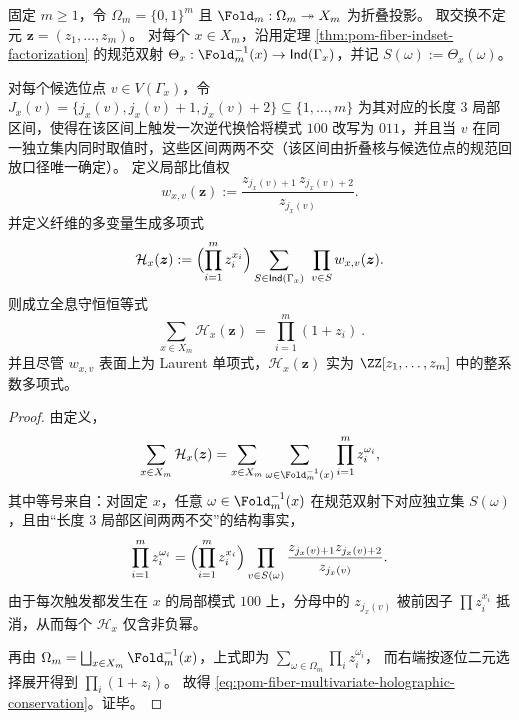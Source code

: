 \begin{theorem}\label{thm:pom-fiber-multivariate-holographic-conservation}
固定 \(m\ge 1\)，令 \(\Omega_m=\{0,1\}^m\) 且 \(\Fold_m:\Omega_m\twoheadrightarrow X_m\) 为折叠投影。
取交换不定元 \(\boldsymbol{z}=(z_1,\dots,z_m)\)。
对每个 \(x\in X_m\)，沿用定理 \ref{thm:pom-fiber-indset-factorization} 的规范双射
\(
\Theta_x:\Fold_m^{-1}(x)\to \mathsf{Ind}(\Gamma_x)
\)，并记 \(S(\omega):=\Theta_x(\omega)\)。
\par
对每个候选位点 \(v\in V(\Gamma_x)\)，令 \(J_x(v)=\{j_x(v),j_x(v)+1,j_x(v)+2\}\subseteq\{1,\dots,m\}\) 为其对应的长度 \(3\) 局部区间，使得在该区间上触发一次逆代换恰将模式 \(100\) 改写为 \(011\)，并且当 \(v\) 在同一独立集内同时取值时，这些区间两两不交（该区间由折叠核与候选位点的规范回放口径唯一确定）。
定义局部比值权
\[
w_{x,v}(\boldsymbol{z})
:=\frac{z_{j_x(v)+1}\,z_{j_x(v)+2}}{z_{j_x(v)}}.
\]
并定义纤维的多变量生成多项式
\[
\mathcal H_x(\boldsymbol{z})
:=\Bigl(\prod_{i=1}^{m}z_i^{x_i}\Bigr)
\sum_{S\in\mathsf{Ind}(\Gamma_x)}\ \prod_{v\in S}w_{x,v}(\boldsymbol{z}).
\]
则成立全息守恒恒等式
\begin{equation}\label{eq:pom-fiber-multivariate-holographic-conservation}
\boxed{\ \sum_{x\in X_m}\mathcal H_x(\boldsymbol{z})\ =\ \prod_{i=1}^{m}(1+z_i)\ }.
\end{equation}
并且尽管 \(w_{x,v}\) 表面上为 Laurent 单项式，\(\mathcal H_x(\boldsymbol{z})\) 实为 \(\ZZ[z_1,\dots,z_m]\) 中的整系数多项式。
\end{theorem}

\begin{proof}
由定义，
\[
\sum_{x\in X_m}\mathcal H_x(\boldsymbol{z})
=\sum_{x\in X_m}\sum_{\omega\in\Fold_m^{-1}(x)}\prod_{i=1}^{m}z_i^{\omega_i},
\]
其中等号来自：对固定 \(x\)，任意 \(\omega\in\Fold_m^{-1}(x)\) 在规范双射下对应独立集 \(S(\omega)\)，且由“长度 \(3\) 局部区间两两不交”的结构事实，
\[
\prod_{i=1}^{m}z_i^{\omega_i}
=\Bigl(\prod_{i=1}^{m}z_i^{x_i}\Bigr)\prod_{v\in S(\omega)}\frac{z_{j_x(v)+1}z_{j_x(v)+2}}{z_{j_x(v)}}.
\]
由于每次触发都发生在 \(x\) 的局部模式 \(100\) 上，分母中的 \(z_{j_x(v)}\) 被前因子 \(\prod z_i^{x_i}\) 抵消，从而每个 \(\mathcal H_x\) 仅含非负幂。
\par
再由 \(\Omega_m=\bigsqcup_{x\in X_m}\Fold_m^{-1}(x)\)，上式即为
\(
\sum_{\omega\in\Omega_m}\prod_i z_i^{\omega_i}
\)，
而右端按逐位二元选择展开得到 \(\prod_i(1+z_i)\)。
故得 \eqref{eq:pom-fiber-multivariate-holographic-conservation}。证毕。
\end{proof}

